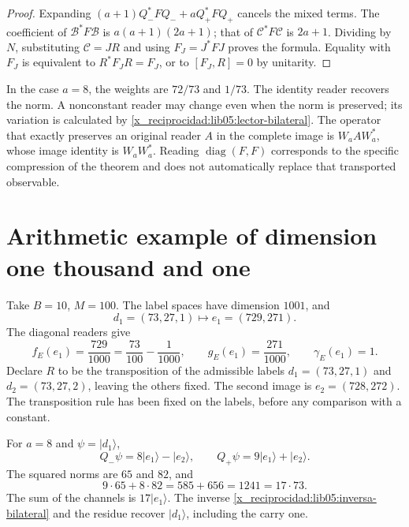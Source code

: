 \begin{proof}
Expanding \((a+1)Q_-^*FQ_-+aQ_+^*FQ_+\) cancels the
mixed terms. The coefficient of \(\mathcal B^*F\mathcal B\)
is \(a(a+1)(2a+1)\); that of
\(\mathcal C^*F\mathcal C\) is \(2a+1\). Dividing by
\(N\), substituting \(\mathcal C=JR\) and using
\(F_J=J^*FJ\) proves the formula. Equality with \(F_J\)
is equivalent to \(R^*F_JR=F_J\), or to \([F_J,R]=0\) by
unitarity.
\end{proof}

In the case \(a=8\), the weights are \(72/73\) and \(1/73\).
The identity reader recovers the norm. A nonconstant reader
may change even when the norm is preserved; its variation is
calculated by \eqref{x_reciprocidad:lib05:lector-bilateral}.
The operator that exactly preserves an original reader \(A\)
in the complete image is \(W_aAW_a^*\), whose image identity
is \(W_aW_a^*\). Reading \(\operatorname{diag}(F,F)\) corresponds
to the specific compression of the theorem and does not automatically
replace that transported observable.

\section{Arithmetic example of dimension one thousand and one}
\label{x_reciprocidad:lib05:ejemplo}

Take \(B=10\), \(M=100\). The label spaces have
dimension \(1001\), and
\begin{equation}
 d_1=(73,27,1)\longmapsto e_1=(729,271).
 \label{x_reciprocidad:lib05:ejemplo-etiqueta}
\end{equation}
The diagonal readers give
\begin{equation}
 f_E(e_1)=\frac{729}{1000}
 =\frac{73}{100}-\frac1{1000},\qquad
 g_E(e_1)=\frac{271}{1000},\qquad \gamma_E(e_1)=1.
 \label{x_reciprocidad:lib05:ejemplo-lectores}
\end{equation}
Declare \(R\) to be the transposition of the admissible
labels \(d_1=(73,27,1)\) and \(d_2=(73,27,2)\), leaving
the others fixed. The second image is \(e_2=(728,272)\).
The transposition rule has been fixed on the labels, before
any comparison with a constant.

For \(a=8\) and \(\psi=|d_1\rangle\),
\begin{equation}
 Q_-\psi=8|e_1\rangle-|e_2\rangle,\qquad
 Q_+\psi=9|e_1\rangle+|e_2\rangle.
 \label{x_reciprocidad:lib05:ejemplo-canales}
\end{equation}
The squared norms are \(65\) and \(82\), and
\begin{equation}
 9\cdot65+8\cdot82=585+656=1241=17\cdot73.
 \label{x_reciprocidad:lib05:ejemplo-balance}
\end{equation}
The sum of the channels is \(17|e_1\rangle\). The inverse
\eqref{x_reciprocidad:lib05:inversa-bilateral} and the residue recover
\(|d_1\rangle\), including the carry one.

